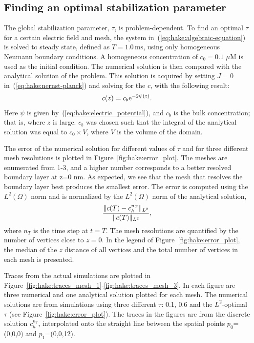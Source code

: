 \vspace*{-3pt}\subsection{Finding an optimal stabilization parameter}
The global stabilization parameter, $\tau$, is problem-dependent. To
find an optimal $\tau$ for a certain electric field and mesh, the
system in~(\ref{eq:hake:algebraic-equation}) is solved to steady
state, defined as $T = 1.0\,\mathrm{ms}$, using only homogeneous
Neumann boundary conditions. A homogeneous concentration of $c_0=0.1$
$\mu$M is used as the initial condition. The numerical solution is
then compared with the analytical solution of the problem. This solution
is acquired by setting $J=0$ in~(\ref{eq:hake:nernst-planck}) and
solving for the $c$, with the following result:
\begin{equation}
  \label{eq:hake:analytic-solution}
  c(z) = c_b\mathrm{e}^{-2\psi(z)}.
\end{equation}
Here $\psi$ is given by~(\ref{eq:hake:electric_potential}), and
$c_b$ is the bulk concentration; that is, where $z$ is large. $c_b$ was
chosen such that the integral of the analytical solution was equal to
$c_0\times V$, where $V$ is the volume of the domain.

The error of the numerical solution for different values of $\tau$ and
for three different mesh resolutions is plotted in
Figure~\ref{fig:hake:error_plot}. The meshes are enumerated from 1-3,
and a higher number corresponds to a better resolved boundary layer at
z=0 nm. As expected, we see that the mesh that resolves the boundary
layer best produces the smallest error. The error is computed using
the $L^2(\Omega)$ norm and is normalized by the $L^2(\Omega)$ norm of
the analytical solution,
\begin{equation}
  \label{eq:hake:error_norm}
  \frac{\|c(T)-c_h^{n_T}\|_{L^2}}{\|c(T)\|_{L^2}},
\end{equation}
where $n_T$ is the time step at $t=T$. The mesh resolutions are
quantified by the number of vertices close to $z=0$. In the legend of
Figure~\ref{fig:hake:error_plot}, the median of the $z$ distance of all
vertices and the total number of vertices in each mesh is presented.

Traces from the actual simulations are plotted in
Figure~\ref{fig:hake:traces_mesh_1}-\ref{fig:hake:traces_mesh_3}. In
each figure are three numerical and one analytical solution plotted
for each mesh. The numerical\vadjust{\pagebreak} solutions are from simulations using
three different $\tau$: 0.1, 0.6 and the $L^2$-optimal $\tau$ (see
Figure~\ref{fig:hake:error_plot}). The traces in the figures are from
the discrete solution $c_h^{n_T}$, interpolated onto the straight line
between the spatial points $p_0$=(0,0,0) and $p_1$=(0,0,12).

